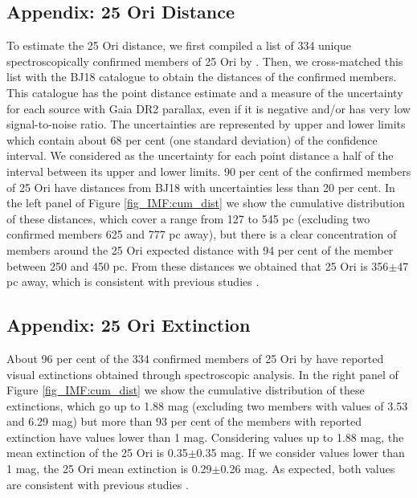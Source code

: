 \documentclass[12pt]{article}
\begin{document}
\subsection{Appendix: 25 Ori Distance}
\label{sec_app_IMF:distance}

To estimate the 25 Ori distance, we first compiled a list of 334 unique spectroscopically confirmed members of 25 Ori by \citet{Briceno2005,Briceno2007,Downes2014,Downes2015,Suarez2017,Briceno2018}. Then, we cross-matched this list with the BJ18 catalogue to obtain the distances of the confirmed members. This catalogue has the point distance estimate and a measure of the uncertainty for each source with Gaia DR2 parallax, even if it is negative and/or has very low signal-to-noise ratio. The uncertainties are represented by upper and lower limits which contain about 68 per cent (one standard deviation) of the confidence interval. We considered as the uncertainty for each point distance a half of the interval between its upper and lower limits. 90 per cent of the confirmed members of 25 Ori have distances from BJ18 with uncertainties less than 20 per cent. In the left panel of Figure \ref{fig_IMF:cum_dist} we show the cumulative distribution of these distances, which cover a range from 127 to 545 pc (excluding two confirmed members 625 and 777 pc away), but there is a clear concentration of members around the 25 Ori expected distance with 94 per cent of the member between 250 and 450 pc. From these distances we obtained that 25 Ori is 356$\pm$47 pc away, which is consistent with previous studies \citep{Briceno2007,Downes2014,Suarez2017,Briceno2018,Kounkel2018}.

\subsection{Appendix: 25 Ori Extinction}
\label{sec_app_IMF:extinction}

About 96 per cent of the 334 confirmed members of 25 Ori by \citet{Briceno2005,Briceno2007,Downes2014,Downes2015,Suarez2017,Briceno2018} have reported visual extinctions obtained through spectroscopic analysis. In the right panel of Figure \ref{fig_IMF:cum_dist} we show the cumulative distribution of these extinctions, which go up to 1.88 mag (excluding two members with values of 3.53 and 6.29 mag) but more than 93 per cent of the members with reported extinction have values lower than 1 mag. Considering values up to 1.88 mag, the mean extinction of the 25 Ori is 0.35$\pm$0.35 mag. If we consider values lower than 1 mag, the 25 Ori mean extinction is 0.29$\pm$0.26 mag. As expected, both values are consistent with previous studies \citep{Kharchenko2005,Briceno2005,Briceno2007,Downes2014,Suarez2017,Briceno2018}. 
\end{document}

